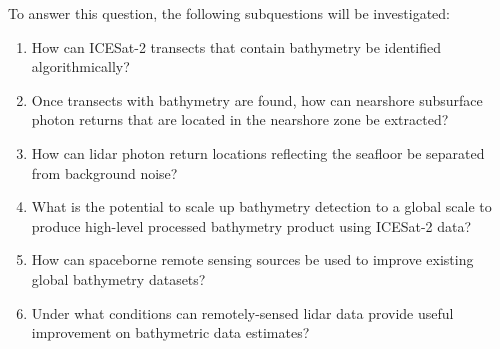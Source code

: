 To answer this question, the following subquestions will be investigated:

\begin{enumerate} 
      \item How can ICESat-2 transects that contain bathymetry be identified algorithmically?
      \item Once transects with bathymetry are found, how can nearshore subsurface photon returns that are located in the nearshore zone be extracted?
      \item How can lidar photon return locations reflecting the seafloor be separated from background noise?
      \item What is the potential to scale up bathymetry detection to a global scale to produce high-level processed bathymetry product using ICESat-2 data?
      \item How can spaceborne remote sensing sources be used to improve existing global bathymetry datasets?
      \item Under what conditions can remotely-sensed lidar data provide useful improvement on bathymetric data estimates?
\end{enumerate}
